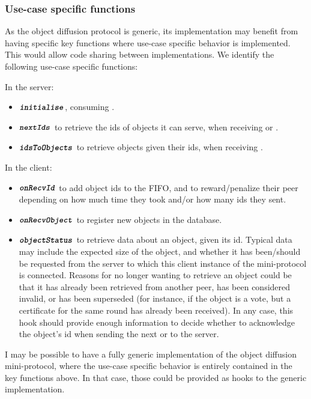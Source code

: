 \subsubsection{Use-case specific functions}

As the object diffusion protocol is generic, its implementation may benefit from having specific key functions where use-case specific behavior is implemented.
This would allow code sharing between implementations.
We identify the following use-case specific functions:

In the server:
\begin{itemize}
  \item $\textbf{\texttt{\textit{initialise}}}$, consuming .
  \item $\textbf{\texttt{\textit{nextIds}}}$ to retrieve the ids of objects it can serve, when receiving \MsgRequestObjIdsB{} or \MsgRequestObjIdsNB{}.
  \item $\textbf{\texttt{\textit{idsToObjects}}}$ to retrieve objects given their ids, when receiving \MsgRequestObjs{}.
\end{itemize}

In the client:
\begin{itemize}
  \item $\textbf{\texttt{\textit{onRecvId}}}$ to add object ids to the FIFO, and to reward/penalize their peer depending on how much time they took and/or how many ids they sent.
  \item $\textbf{\texttt{\textit{onRecvObject}}}$ to register new objects in the database.
  \item $\textbf{\texttt{\textit{objectStatus}}}$ to retrieve data about an object, given its id.
  Typical data may include the expected size of the object, and whether it has been/should be requested from the server to which this client instance of the mini-protocol is connected.
  Reasons for no longer wanting to retrieve an object could be that it has already been retrieved from another peer, has been considered invalid, or has been superseded (for instance, if the object is a vote, but a certificate for the same round has already been received).
  In any case, this hook should provide enough information to decide whether to acknowledge the object's id when sending the next \MsgRequestObjIdsB{} or \MsgRequestObjIdsNB{} to the server.
\end{itemize}

I may be possible to have a fully generic implementation of the object diffusion mini-protocol, where the use-case specific behavior is entirely contained in the key functions above.
In that case, those could be provided as hooks to the generic implementation.

